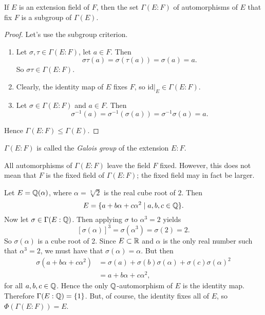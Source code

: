 \begin{lemma}
	If $E$ is an extension field of $F$, then the set $\Gamma(E : F)$ of automorphisms of $E$ that fix $F$ is a subgroup of $\Gamma(E)$.
	\begin{proof}
		Let's use the subgroup criterion.
		\begin{enumerate}
			\item Let $\sigma, \tau \in \Gamma(E : F)$, let $a \in F$. Then
			\[
				\sigma\tau(a) = \sigma(\tau(a)) = \sigma(a) = a.
			\]
			So $\sigma\tau \in \Gamma(E : F)$.
			\item Clearly, the identity map of $E$ fixes $F$, so $\text{id}|_E \in \Gamma(E : F)$.
			\item Let $\sigma \in \Gamma(E : F)$ and $a \in F$. Then
			\[
				\sigma^{-1}(a) = \sigma^{-1}(\sigma(a)) = \sigma^{-1}\sigma(a) = a.
			\]
		\end{enumerate}
		Hence $\Gamma(E : F) \leq \Gamma(E)$.
	\end{proof}
\end{lemma}

\begin{definition}
	\emph{$\Gamma(E : F)$} is called the \emph{Galois group} of the extension $E : F$.
\end{definition}

\begin{remark}
	All automorphisms of $\Gamma(E : F)$ leave the field $F$ fixed. However, this does not mean that $F$ is the fixed field of $\Gamma(E : F)$; the fixed field may in fact be larger.
\end{remark}

\begin{example}
	Let $E = \mathbb{Q}(\alpha)$, where $\alpha = \sqrt[3]{2}$ is the real cube root of $2$. Then
	\[
		E = \{a + b\alpha + c\alpha^2 \mid a, b, c \in \mathbb{Q}\}.
	\]
	Now let $\sigma \in \Gamma(E : \mathbb{Q})$. Then applying $\sigma$ to $\alpha^3 = 2$ yields
	\[
		[\sigma(\alpha)]^3 = \sigma(\alpha^3) = \sigma(2) = 2.
	\]
	So $\sigma(\alpha)$ is a cube root of 2. Since $E \subset \mathbb{R}$ and $\alpha$ is the only real number such that $\alpha^3 = 2$, we must have that $\sigma(\alpha) = \alpha$. But then
	\begin{align*}
		\sigma(a + b\alpha + c\alpha^2) &= \sigma(a) + \sigma(b)\sigma(\alpha) + \sigma(c)\sigma(\alpha)^2 \\
			&= a + b\alpha + c\alpha^2,
	\end{align*}
	for all $a, b, c \in \mathbb{Q}$. Hence the only $\mathbb{Q}$-automorphism of $E$ is the identity map. Therefore $\Gamma(E : \mathbb{Q}) = \{1\}$. But, of course, the identity fixes all of $E$, so $\Phi(\Gamma(E : F)) = E$.
\end{example}

